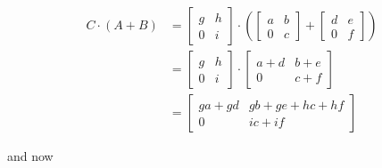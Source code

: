 \documentclass{article}
\begin{document}
    \begin{equation*}
      \begin{split}
        C \cdot (A + B) &= 
          \begin{bmatrix}
            g & h\\
            0 & i
          \end{bmatrix} \cdot \left( 
          \begin{bmatrix}
            a & b\\
            0 & c
          \end{bmatrix}
         +
        \begin{bmatrix} 
          d & e\\
          0 & f
        \end{bmatrix}
        \right)\\
        &=
          \begin{bmatrix}
            g & h\\
            0 & i
          \end{bmatrix}
          \cdot
          \begin{bmatrix}
            a+d & b+e\\
            0 & c+f
          \end{bmatrix}\\
        &=
          \begin{bmatrix}
            ga+gd & gb+ge+hc+hf\\
            0 & ic+if
          \end{bmatrix}
      \end{split}
    \end{equation*}

    and now
\end{document}
